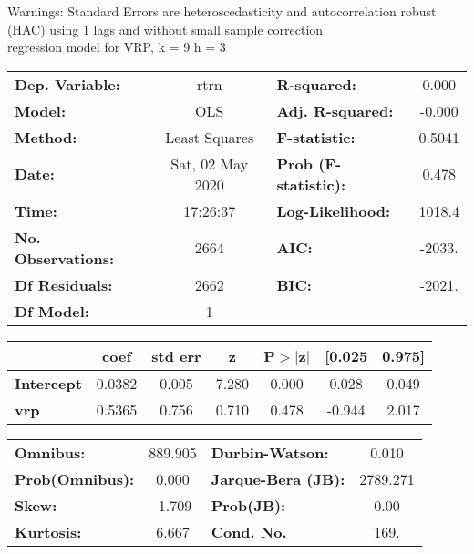 Warnings: \newline
 [1] Standard Errors are heteroscedasticity and autocorrelation robust (HAC) using 1 lags and without small sample correction\\ 

regression model for VRP, k = 9 h = 3\begin{center}
\begin{tabular}{lclc}
\toprule
\textbf{Dep. Variable:}    &       rtrn       & \textbf{  R-squared:         } &     0.000   \\
\textbf{Model:}            &       OLS        & \textbf{  Adj. R-squared:    } &    -0.000   \\
\textbf{Method:}           &  Least Squares   & \textbf{  F-statistic:       } &    0.5041   \\
\textbf{Date:}             & Sat, 02 May 2020 & \textbf{  Prob (F-statistic):} &    0.478    \\
\textbf{Time:}             &     17:26:37     & \textbf{  Log-Likelihood:    } &    1018.4   \\
\textbf{No. Observations:} &        2664      & \textbf{  AIC:               } &    -2033.   \\
\textbf{Df Residuals:}     &        2662      & \textbf{  BIC:               } &    -2021.   \\
\textbf{Df Model:}         &           1      & \textbf{                     } &             \\
\bottomrule
\end{tabular}
\begin{tabular}{lcccccc}
                   & \textbf{coef} & \textbf{std err} & \textbf{z} & \textbf{P$> |$z$|$} & \textbf{[0.025} & \textbf{0.975]}  \\
\midrule
\textbf{Intercept} &       0.0382  &        0.005     &     7.280  &         0.000        &        0.028    &        0.049     \\
\textbf{vrp}       &       0.5365  &        0.756     &     0.710  &         0.478        &       -0.944    &        2.017     \\
\bottomrule
\end{tabular}
\begin{tabular}{lclc}
\textbf{Omnibus:}       & 889.905 & \textbf{  Durbin-Watson:     } &    0.010  \\
\textbf{Prob(Omnibus):} &   0.000 & \textbf{  Jarque-Bera (JB):  } & 2789.271  \\
\textbf{Skew:}          &  -1.709 & \textbf{  Prob(JB):          } &     0.00  \\
\textbf{Kurtosis:}      &   6.667 & \textbf{  Cond. No.          } &     169.  \\
\bottomrule
\end{tabular}
\end{center}

